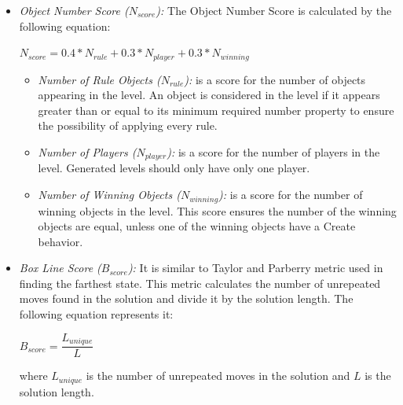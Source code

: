 \documentclass[letterpaper]{article}
\begin{document}
\begin{itemize}
	\item \emph{Object Number Score ($N_{score}$):} The Object Number Score is calculated by the following equation:
	\begin{center}$N_{score} = 0.4 * N_{rule} + 0.3 * N_{player} + 0.3 * N_{winning}$\end{center}
	\begin{itemize}
		\item \emph{Number of Rule Objects ($N_{rule}$):} is a score for the number of objects appearing in the level. An object is considered in the level if it appears greater than or equal to its minimum required number property to ensure the possibility of applying every rule.
		\item \emph{Number of Players ($N_{player}$):} is a score for the number of players in the level. Generated levels should only have only one player.
		\item \emph{Number of Winning Objects ($N_{winning}$):} is a score for the number of winning objects in the level. This score ensures the number of the winning objects are equal, unless one of the winning objects have a Create behavior.
	\end{itemize}
	
	\item \emph{Box Line Score ($B_{score}$):} It is similar to Taylor and Parberry metric \cite{sokobanLevelGenerationNew} used in finding the farthest state. This metric calculates the number of unrepeated moves found in the solution and divide it by the solution length. The following equation represents it:
	\begin{center}$B_{score} = \dfrac{L_{unique}}{L}$\end{center}
	where $L_{unique}$ is the number of unrepeated moves in the solution and $L$ is the solution length.
	

\end{itemize}
\end{document}
